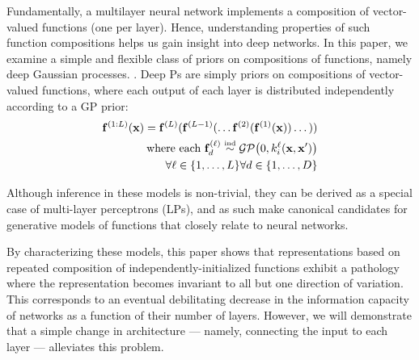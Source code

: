 \documentclass[twoside]{article}
\makeatletter
\newlength{\nonHumbleHeight}
\def\@humbleformat#1{{\settoheight{\nonHumbleHeight}{#1}\resizebox{!}{0.94\nonHumbleHeight}{#1}}}%
\def\humble#1{\@humbleformat{#1}}%
\newcommand{\gp}{{\humble GP}}
\newcommand{\MLP}{{\humble MLP}}
\makeatother
\begin{document}
Fundamentally, a multilayer neural network implements a composition of vector-valued functions (one per layer). Hence, understanding properties of such function compositions helps us gain insight into deep networks. In this paper, we examine a simple and flexible class of priors on compositions of functions, namely deep Gaussian processes. \citep{damianou2012deep}.  Deep \gp{}s are simply priors on compositions of vector-valued functions, where each output of each layer is distributed independently according to a GP prior:
%
\begin{align}
\vf^{(1:L)}(\vx) = \vf^{(L)}(\vf^{(L-1)}(\dots \vf^{(2)}(\vf^{(1)}(\vx)) \dots)) \\ 
\textnormal{ where each $\vf_d^{(\ell)} \simind \GPt{0}{k^\ell_i(\vx, \vx')}$} \\ \forall \ell \in \{1, \dots, L\} \forall d \in \{ 1, \dots, D \} \nonumber
\end{align}

Although inference in these models is non-trivial, they can be derived as a special case of multi-layer perceptrons (\MLP{}s), and as such make canonical candidates for generative models of functions that closely relate to neural networks.

By characterizing these models, this paper shows that representations based on repeated composition of independently-initialized functions exhibit a pathology where the representation becomes invariant to all but one direction of variation. This corresponds to an eventual debilitating decrease in the information capacity of networks as a function of their number of layers. However, we will demonstrate that a simple change in architecture --- namely, connecting the input to each layer --- alleviates this problem. 


\end{document}
